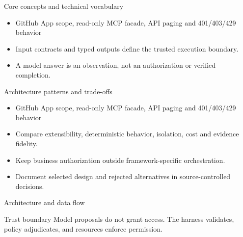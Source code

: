 \documentclass[aspectratio=169,10pt]{beamer}
\begin{document}
\begin{frame}{Core concepts and technical vocabulary}
\small
\begin{itemize}
\item GitHub App scope, read-only MCP facade, API paging and 401/403/429 behavior
\item Input contracts and typed outputs define the trusted execution boundary.
\item A model answer is an observation, not an authorization or verified completion.
\end{itemize}

\end{frame}

\begin{frame}{Architecture patterns and trade-offs}
\small
\begin{itemize}
\item GitHub App scope, read-only MCP facade, API paging and 401/403/429 behavior
\item Compare extensibility, deterministic behavior, isolation, cost and evidence fidelity.
\item Keep business authorization outside framework-specific orchestration.
\item Document selected design and rejected alternatives in source-controlled decisions.
\end{itemize}

\end{frame}

\begin{frame}{Architecture and data flow}
\small
\centering
{}
\vspace{0.6cm}
\begin{block}{Trust boundary}
Model proposals do not grant access. The harness validates, policy adjudicates, and resources enforce permission.
\end{block}
\end{frame}
\end{document}
